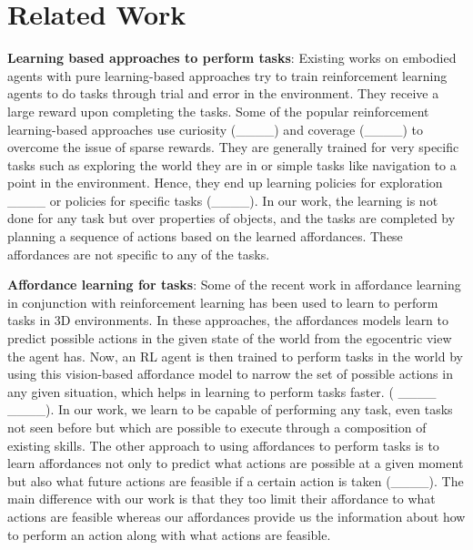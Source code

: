 \section{Related Work}
\label{related_work}

\textbf{Learning based approaches to perform tasks}: Existing works on embodied agents with pure learning-based approaches try to train reinforcement learning agents to do tasks through trial and error in the environment. They receive a large reward upon completing the tasks. Some of the popular reinforcement learning-based approaches use curiosity (____) and coverage (____) to overcome the issue of sparse rewards. They are generally trained for very specific tasks such as exploring the world they are in or simple tasks like navigation to a point in the environment. Hence, they end up learning policies for exploration ____ or policies for specific tasks (____). In our work, the learning is not done for any task but over properties of objects, and the tasks are completed by planning a sequence of actions based on the learned affordances. These affordances are not specific to any of the tasks.


\textbf{Affordance learning for tasks}: Some of the recent work in affordance learning in conjunction with reinforcement learning has been used to learn to perform tasks in 3D environments. In these approaches, the affordances models learn to predict possible actions in the given state of the world from the egocentric view the agent has. Now, an RL agent is then trained to perform tasks in the world by using this vision-based affordance model to narrow the set of possible actions in any given situation, which helps in learning to perform tasks faster.
( ____ ____). In our work, we learn to be capable of performing any task, even tasks not seen before but which are possible to execute through a composition of existing skills. The other approach to using affordances to perform tasks is to learn affordances not only to predict what actions are possible at a given moment but also what future actions are feasible if a certain action is taken (____). The main difference with our work is that they too limit their affordance to what actions are feasible whereas our affordances provide us the information about how to perform an action along with what actions are feasible. 

